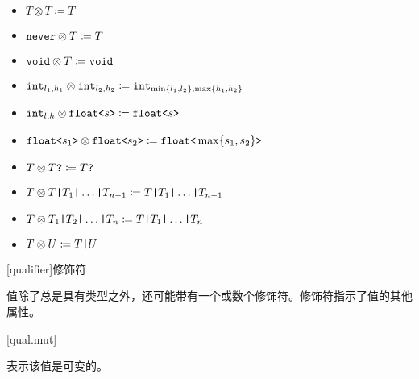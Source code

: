 \begin{itemize}
\item $T \otimes T \coloneqq T$
\item $\texttt{never} \otimes T \coloneqq T$
\item $\texttt{void} \otimes T \coloneqq \texttt{void}$
\item $\texttt{int}_{l_1,h_1} \otimes \texttt{int}_{l_2,h_2} \coloneqq \texttt{int}_{\min\{l_1, l_2\},\max\{h_1, h_2\}}$
\item $\texttt{int}_{l,h} \otimes \texttt{float<}s\texttt{>} \coloneqq \texttt{float<}s\texttt{>}$
\item $\texttt{float<}s_1\texttt{>} \otimes \texttt{float<}s_2\texttt{>} \coloneqq \texttt{float<}\max\{s_1, s_2\}\texttt{>}$
\item $T \otimes T\texttt{?} \coloneqq T\texttt{?}$
\item $T \otimes T \texttt{|} T_1 \texttt{|} \ldots \texttt{|} T_{n-1} \coloneqq T \texttt{|} T_1 \texttt{|} \ldots \texttt{|} T_{n-1}$
\item $T \otimes T_1 \texttt{|} T_2 \texttt{|} \ldots \texttt{|} T_n \coloneqq T \texttt{|} T_1 \texttt{|} \ldots \texttt{|} T_n$
\item $T \otimes U \coloneqq T \texttt{|} U$
\end{itemize}

[qualifier]{修饰符}

\pnum
值除了总是具有类型之外，还可能带有一个或数个修饰符。修饰符指示了值的其他属性。

[qual.mut]{}

\pnum
{} 表示该值是可变的。